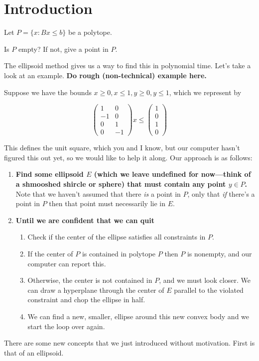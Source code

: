 \section{Introduction}
Let \(P = \{x : Bx \leq b\}\) be a polytope.
\begin{question}
  Is \(P\) empty? If not, give a point in \(P\).
\end{question}

The ellipsoid method gives us a way to find this in polynomial time. Let's take
a look at an example.  \textbf{\color{red}Do rough (non-technical) example here.}

\begin{example}
  \def\A{\left(\begin{matrix} 1 & 0 \\ -1 & 0 \\ 0 & 1 \\ 0 & -1 \end{matrix}\right) }
  \def\b{\left(\begin{matrix} 1\\ 0\\ 1\\ 0 \end{matrix}\right)}
  Suppose we have the bounds \(x \geq 0, x \leq 1, y \geq 0, y \leq 1\), which
  we represent by

  \[\A x \leq \b \]
  
  This defines the unit square, which you and I know, but our computer hasn't
  figured this out yet, so we would like to help it along. Our approach is as
  follows:
  \begin{enumerate}
    \item \textbf{Find some ellipsoid \(E\) (which we leave undefined for now---think of
      a shmooshed shircle or sphere) that must contain any point \(y \in P\).}
      Note that we haven't assumed that there \textit{is} a point in \(P\), only
      that \textit{if} there's a point in \(P\) then that point must necessarily
      lie in \(E\).

    \item \textbf{Until we are confident that we can quit}
      \begin{enumerate}
        \item Check if the center of the ellipse satisfies all constraints in
          \(P\).
        \item If the center of \(P\) is contained in polytope \(P\) then
          \(P\) is nonempty, and our computer can report this.

        \item Otherwise, the center is not contained in \(P\), and we must look
          closer. We can draw a hyperplane through the center of \(E\) parallel
          to the violated constraint and chop the ellipse in half.

        \item We can find a new, smaller, ellipse around this new convex body
          and we start the loop over again.
      \end{enumerate}
  \end{enumerate}
\end{example}


There are some new concepts that we just introduced without motivation. First is
that of an ellipsoid. 
